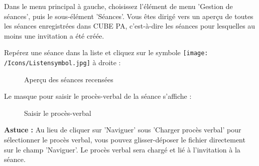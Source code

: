 Dans le menu principal à gauche, choisissez l'élément de menu 'Gestion de séances', puis le sous-élément 'Séances'. Vous êtes dirigé vers un aperçu de toutes les séances enregistrées dans CUBE PA, c'est-à-dire les séances pour lesquelles au moins une invitation a été créée. \newline

\vspace{6.5cm} 

Repérez une séance dans la liste et cliquez sur le symbole \texttt{[image: /Icons/Listensymbol.jpg]}  à droite :

\begin{figure}[H]
\caption{Aperçu des séances recensées}
\end{figure}

\vspace{\baselineskip}

Le masque pour saisir le procès-verbal de la séance s'affiche :

\begin{figure}[H]
\caption{Saisir le procès-verbal}
\end{figure}

\textbf{Astuce :} Au lieu de cliquer sur 'Naviguer' sous 'Charger procès verbal' pour sélectionner le procès verbal, vous pouvez glisser-déposer le fichier directement sur le champ 'Naviguer'. Le procès verbal sera chargé et lié à l'invitation à la séance.

\vspace{\baselineskip}

